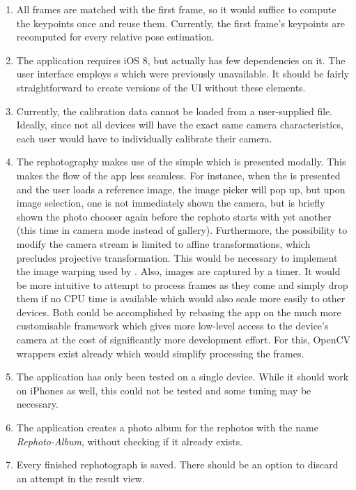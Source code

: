 \begin{enumerate}
   \item All frames are matched with the first frame, so it would suffice to
      compute the keypoints once and reuse them. Currently, the first frame's keypoints
      are recomputed for every relative pose estimation.

   \item The application requires iOS 8, but actually has few dependencies on
      it. The user interface employs s which were
      previously unavailable. It should be fairly straightforward to create
      versions of the UI without these elements.

   \item Currently, the calibration data cannot be loaded from a user-supplied
      file. Ideally, since not all devices will have the exact same camera
      characteristics, each user would have to individually calibrate their
      camera.

   \item The rephotography makes use of the simple
       which is presented modally. This makes the
      flow of the app less seamless. For instance, when the
       is presented and the user loads a reference image,
      the image picker will pop up, but upon image selection, one is not
      immediately shown the camera, but is briefly shown the photo chooser again
      before the rephoto starts with yet another 
      (this time in camera mode instead of gallery).
      Furthermore, the possibility to modify the camera stream is limited to
      affine transformations, which precludes projective transformation. This
      would be necessary to implement the image warping used by \citet{bae2010}.
      Also, images are captured by a timer. It would be more intuitive to
      attempt to process frames as they come and simply drop them if no CPU time
      is available which would also scale more easily to other devices. Both
      could be accomplished by rebasing the app on the much more customisable
       framework which gives more low-level access to the device's
      camera at the cost of significantly more development effort.
      For this, OpenCV wrappers exist already which would simplify processing the frames.  

   \item The application has only been tested on a single device. While it
      should work on iPhones as well, this could not be tested and some tuning
      may be necessary.

   \item The application creates a photo album for the rephotos with the name
      \emph{Rephoto-Album}, without checking if it already exists.

   \item Every finished rephotograph is saved. There should be an option to
      discard an attempt in the result view.

\end{enumerate}


